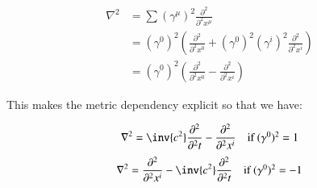 \documentclass{article}
\newcommand{\grad}[0]{\nabla}
\newcommand{\PDsq}[2]{\frac{\partial^2 {#2}}{\partial^2 {#1}}}
\begin{document}
\begin{align*}
\grad^2
&= \sum (\gamma^{\mu})^2 \PDsq{x^{\mu}}{} \\
&= (\gamma^0)^2 \left( \PDsq{x^0}{} + (\gamma^0)^2 (\gamma^i)^2 \PDsq{x^i}{} \right) \\
&= (\gamma^0)^2 \left( \PDsq{x^0}{} - \PDsq{x^i}{} \right)
\end{align*}

This makes the metric dependency explicit so that we have:

\begin{equation*}
\grad^2 = \inv{c^2} \PDsq{t}{} - \PDsq{x^i}{} \quad \mbox{if $(\gamma^0)^2 = 1$}
\end{equation*}
\begin{equation*}
\grad^2 = \PDsq{x^i}{} - \inv{c^2} \PDsq{t}{} \quad \mbox{if $(\gamma^0)^2 = -1$}
\end{equation*}
\end{document}
